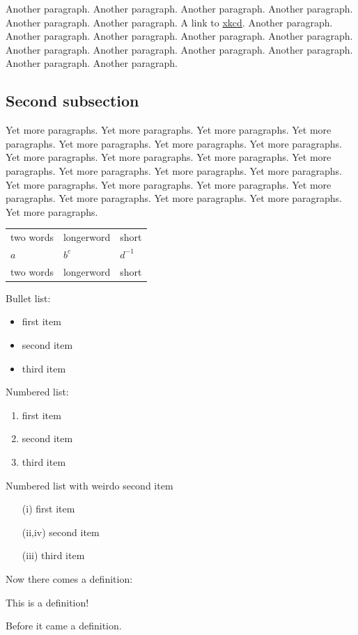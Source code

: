 Another paragraph.  Another paragraph.  Another paragraph.
Another paragraph.  Another paragraph.  Another paragraph.
A link to \href{http://www.xkcd.com/}{xkcd}.
Another paragraph.  Another paragraph.  Another paragraph.
Another paragraph.  Another paragraph.  Another paragraph.
Another paragraph.  Another paragraph.  Another paragraph.
Another paragraph.  Another paragraph.

\subsection{Second subsection}

Yet more paragraphs.  Yet more paragraphs.  Yet more %
paragraphs.  Yet more paragraphs.  Yet more paragraphs.  Yet
more paragraphs.  Yet more paragraphs.  Yet more paragraphs.
Yet more paragraphs.  Yet more paragraphs.  Yet more
paragraphs.  Yet more paragraphs.  Yet more paragraphs.  Yet
more paragraphs.  Yet more paragraphs.  Yet more paragraphs.
Yet more paragraphs.  Yet more paragraphs.  Yet more
paragraphs.  Yet more paragraphs.  Yet more paragraphs.  Yet
more paragraphs.

\begin{tabular}{lll}
	two words & longerword & short \\
	$a$ & $b^c$ & $d^{-1}$ \\
	two words & longerword & short \\
\end{tabular}

Bullet list:
\begin{itemize}
	\item first item
	\item second item
	\item third item
\end{itemize}

Numbered list:
\begin{enumerate}
	\item first item
	\item second item
	\item third item
\end{enumerate}

Numbered list with weirdo second item
\begin{enumerate}
	\item[(i)] first item
	\item[(ii,iv)] second item
	\item[(iii)] third item
\end{enumerate}

Now there comes a definition:

\begin{definition}
	This is a definition!
\end{definition}

Before it came a definition.

